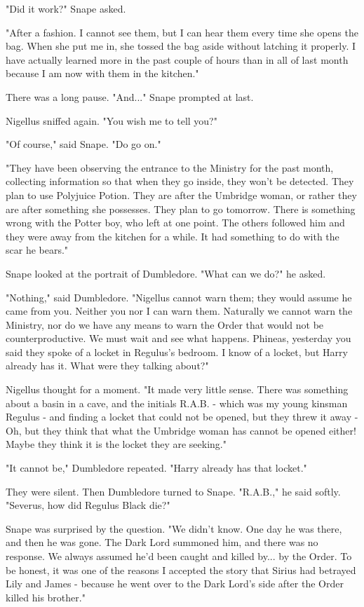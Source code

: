 \documentclass[a4paper,11pt]{article}
\begin{document}
"Did it work?" Snape asked.

"After a fashion. I cannot see them, but I can hear them every time she opens the bag. When she put me in, she tossed the bag aside without latching it properly. I have actually learned more in the past couple of hours than in all of last month because I am now with them in the kitchen."

There was a long pause. "And..." Snape prompted at last.

Nigellus sniffed again. "You wish me to tell you?"

"Of course," said Snape. "Do go on."

"They have been observing the entrance to the Ministry for the past month, collecting information so that when they go inside, they won't be detected. They plan to use Polyjuice Potion. They are after the Umbridge woman, or rather they are after something she possesses. They plan to go tomorrow. There is something wrong with the Potter boy, who left at one point. The others followed him and they were away from the kitchen for a while. It had something to do with the scar he bears."

Snape looked at the portrait of Dumbledore. "What can we do?" he asked.

"Nothing," said Dumbledore. "Nigellus cannot warn them; they would assume he came from you. Neither you nor I can warn them. Naturally we cannot warn the Ministry, nor do we have any means to warn the Order that would not be counterproductive. We must wait and see what happens. Phineas, yesterday you said they spoke of a locket in Regulus's bedroom. I know of a locket, but Harry already has it. What were they talking about?"

Nigellus thought for a moment. "It made very little sense. There was something about a basin in a cave, and the initials R.A.B. - which was my young kinsman Regulus - and finding a locket that could not be opened, but they threw it away - Oh, but they think that what the Umbridge woman has cannot be opened either! Maybe they think it is the locket they are seeking."

"It cannot be," Dumbledore repeated. "Harry already has that locket."

They were silent. Then Dumbledore turned to Snape. "R.A.B.," he said softly. "Severus, how did Regulus Black die?"

Snape was surprised by the question. "We didn't know. One day he was there, and then he was gone. The Dark Lord summoned him, and there was no response. We always assumed he'd been caught and killed by... by the Order. To be honest, it was one of the reasons I accepted the story that Sirius had betrayed Lily and James - because he went over to the Dark Lord's side after the Order killed his brother."
\end{document}

